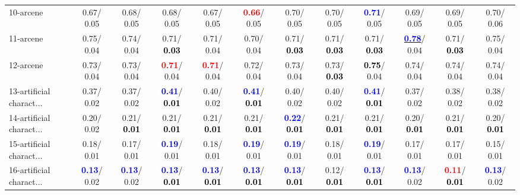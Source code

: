 \begin{table}[h]
\begin{center}
{\begin{tabular}{lc|c|c|c|c|c|c|c|c|c|c}
10-arcene &   0.67/  0.05 &   0.68/  0.05 &   0.68/  0.05 &   0.67/  0.05 & \textcolor{red}{\textbf{  0.66}}/  0.05 &   0.70/  0.05 &   0.70/  0.05 & \textcolor{blue}{\textbf{  0.71}}/  0.05 &   0.69/  0.05 &   0.69/  0.05 &   0.70/  0.06 \\
11-arcene &   0.75/  0.04 &   0.74/  0.04 &   0.71/\textcolor{black}{\textbf{  0.03}} &   0.71/  0.04 &   0.70/  0.04 &   0.71/\textcolor{black}{\textbf{  0.03}} &   0.71/\textcolor{black}{\textbf{  0.03}} &   0.71/\textcolor{black}{\textbf{  0.03}} & \underline{\textcolor{blue}{\textbf{  0.78}}}/  0.04 &   0.71/\textcolor{black}{\textbf{  0.03}} &   0.75/  0.04 \\
12-arcene &   0.73/  0.04 &   0.73/  0.04 & \textcolor{red}{\textbf{  0.71}}/  0.04 & \textcolor{red}{\textbf{  0.71}}/  0.04 &   0.72/  0.04 &   0.73/  0.04 &   0.73/\textcolor{black}{\textbf{  0.03}} & \textcolor{black}{\textbf{  0.75}}/  0.04 &   0.74/  0.04 &   0.74/  0.04 &   0.74/  0.04 \\
13-artificial charact... &   0.37/  0.02 &   0.37/  0.02 & \textcolor{blue}{\textbf{  0.41}}/\textcolor{black}{\textbf{  0.01}} &   0.40/  0.02 & \textcolor{blue}{\textbf{  0.41}}/\textcolor{black}{\textbf{  0.01}} &   0.40/  0.02 &   0.40/  0.02 & \textcolor{blue}{\textbf{  0.41}}/\textcolor{black}{\textbf{  0.01}} &   0.37/  0.02 &   0.38/  0.02 &   0.38/  0.02 \\
14-artificial charact... &   0.20/  0.02 &   0.21/\textcolor{black}{\textbf{  0.01}} &   0.21/\textcolor{black}{\textbf{  0.01}} &   0.21/\textcolor{black}{\textbf{  0.01}} &   0.21/\textcolor{black}{\textbf{  0.01}} & \textcolor{blue}{\textbf{  0.22}}/\textcolor{black}{\textbf{  0.01}} &   0.21/\textcolor{black}{\textbf{  0.01}} &   0.21/\textcolor{black}{\textbf{  0.01}} &   0.20/\textcolor{black}{\textbf{  0.01}} &   0.21/\textcolor{black}{\textbf{  0.01}} &   0.20/\textcolor{black}{\textbf{  0.01}} \\ \hline
15-artificial charact... &   0.18/  0.01 &   0.17/  0.01 & \textcolor{blue}{\textbf{  0.19}}/  0.01 &   0.18/  0.01 & \textcolor{blue}{\textbf{  0.19}}/  0.01 & \textcolor{blue}{\textbf{  0.19}}/  0.01 &   0.18/  0.01 & \textcolor{blue}{\textbf{  0.19}}/  0.01 &   0.17/  0.01 &   0.17/  0.01 &   0.15/  0.01 \\
16-artificial charact... & \textcolor{blue}{\textbf{  0.13}}/  0.02 & \textcolor{blue}{\textbf{  0.13}}/  0.02 & \textcolor{blue}{\textbf{  0.13}}/\textcolor{black}{\textbf{  0.01}} & \textcolor{blue}{\textbf{  0.13}}/\textcolor{black}{\textbf{  0.01}} & \textcolor{blue}{\textbf{  0.13}}/\textcolor{black}{\textbf{  0.01}} & \textcolor{blue}{\textbf{  0.13}}/\textcolor{black}{\textbf{  0.01}} &   0.12/\textcolor{black}{\textbf{  0.01}} & \textcolor{blue}{\textbf{  0.13}}/\textcolor{black}{\textbf{  0.01}} & \textcolor{blue}{\textbf{  0.13}}/  0.02 & \textcolor{red}{\textbf{  0.11}}/\textcolor{black}{\textbf{  0.01}} & \textcolor{blue}{\textbf{  0.13}}/  0.02 \\

\end{tabular}}
\end{center}
\end{table}
